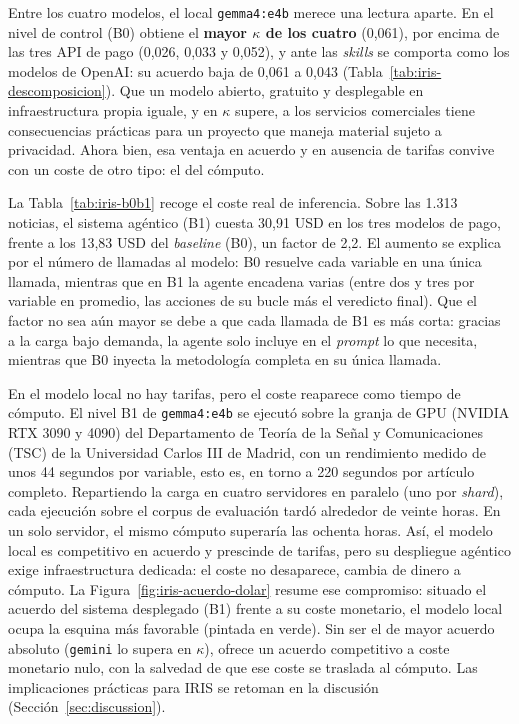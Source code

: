 Entre los cuatro modelos, el local \texttt{gemma4:e4b} merece una lectura aparte. En
el nivel de control (B0) obtiene el \textbf{mayor $\kappa$ de los cuatro} (0,061), por
encima de las tres API de pago (0,026, 0,033 y 0,052), y ante las \textit{skills} se
comporta como los modelos de OpenAI: su acuerdo baja de 0,061 a 0,043
(Tabla~\ref{tab:iris-descomposicion}). Que un modelo abierto, gratuito y desplegable
en infraestructura propia iguale, y en $\kappa$ supere, a los servicios
comerciales tiene consecuencias prácticas para un proyecto que maneja material
sujeto a privacidad. Ahora bien, esa ventaja en acuerdo y en ausencia de tarifas
convive con un coste de otro tipo: el del cómputo.

La Tabla~\ref{tab:iris-b0b1} recoge el coste real de inferencia. Sobre las 1.313
noticias, el sistema agéntico (B1) cuesta 30,91 USD en los tres modelos de pago,
frente a los 13,83 USD del \textit{baseline} (B0), un factor de 2,2. El aumento se
explica por el número de llamadas al modelo: B0 resuelve cada variable en una única
llamada, mientras que en B1 la agente encadena varias (entre dos y tres por variable
en promedio, las acciones de su bucle más el veredicto final). Que el factor no sea
aún mayor se debe a que cada llamada de B1 es más corta: gracias a la carga bajo
demanda, la agente solo incluye en el \textit{prompt} lo que necesita, mientras que
B0 inyecta la metodología completa en su única llamada.


En el modelo local no hay tarifas, pero el coste reaparece como tiempo de cómputo. El
nivel B1 de \texttt{gemma4:e4b} se ejecutó sobre la granja de GPU (NVIDIA RTX 3090 y
4090) del Departamento de Teoría de la Señal y Comunicaciones (TSC) de la Universidad
Carlos III de Madrid, con un rendimiento medido de unos 44 segundos por variable,
esto es, en torno a 220 segundos por artículo completo. Repartiendo la carga en
cuatro servidores en paralelo (uno por \textit{shard}), cada ejecución sobre el corpus
de evaluación tardó alrededor de veinte horas. En un solo servidor, el mismo cómputo
superaría las ochenta horas. Así, el modelo
local es competitivo en acuerdo y prescinde de tarifas, pero su despliegue agéntico
exige infraestructura dedicada: el coste no desaparece, cambia de dinero a cómputo.
La Figura~\ref{fig:iris-acuerdo-dolar} resume ese compromiso: situado el acuerdo del
sistema desplegado (B1) frente a su coste monetario, el modelo local ocupa la esquina
más favorable (pintada en verde). Sin ser el de mayor acuerdo absoluto (\texttt{gemini} lo supera en
$\kappa$), ofrece un acuerdo competitivo a coste monetario nulo, con la salvedad de
que ese coste se traslada al cómputo. Las implicaciones prácticas para IRIS se
retoman en la discusión (Sección~\ref{sec:discussion}).

